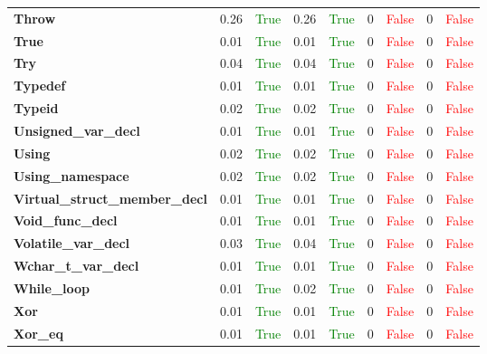 \documentclass{article}
\begin{document}
\begin{xltabular}{\textwidth}{lcccccccc}
\textbf{{\fontsize{10}{12}\selectfont Throw}}& 0.26&\textcolor{green}{True}& 0.26&\textcolor{green}{True}& 0&\textcolor{red}{False}& 0&\textcolor{red}{False} \\[0.5ex]
\textbf{{\fontsize{10}{12}\selectfont True}}& 0.01&\textcolor{green}{True}& 0.01&\textcolor{green}{True}& 0&\textcolor{red}{False}& 0&\textcolor{red}{False} \\[0.5ex]
\textbf{{\fontsize{10}{12}\selectfont Try}}& 0.04&\textcolor{green}{True}& 0.04&\textcolor{green}{True}& 0&\textcolor{red}{False}& 0&\textcolor{red}{False} \\[0.5ex]
\textbf{{\fontsize{10}{12}\selectfont Typedef}}& 0.01&\textcolor{green}{True}& 0.01&\textcolor{green}{True}& 0&\textcolor{red}{False}& 0&\textcolor{red}{False} \\[0.5ex]
\textbf{{\fontsize{10}{12}\selectfont Typeid}}& 0.02&\textcolor{green}{True}& 0.02&\textcolor{green}{True}& 0&\textcolor{red}{False}& 0&\textcolor{red}{False} \\[0.5ex]
\textbf{{\fontsize{10}{12}\selectfont Unsigned\_var\_decl}}& 0.01&\textcolor{green}{True}& 0.01&\textcolor{green}{True}& 0&\textcolor{red}{False}& 0&\textcolor{red}{False} \\[0.5ex]
\textbf{{\fontsize{10}{12}\selectfont Using}}& 0.02&\textcolor{green}{True}& 0.02&\textcolor{green}{True}& 0&\textcolor{red}{False}& 0&\textcolor{red}{False} \\[0.5ex]
\textbf{{\fontsize{10}{12}\selectfont Using\_namespace}}& 0.02&\textcolor{green}{True}& 0.02&\textcolor{green}{True}& 0&\textcolor{red}{False}& 0&\textcolor{red}{False} \\[0.5ex]
\textbf{{\fontsize{10}{12}\selectfont Virtual\_struct\_member\_decl}}& 0.01&\textcolor{green}{True}& 0.01&\textcolor{green}{True}& 0&\textcolor{red}{False}& 0&\textcolor{red}{False} \\[0.5ex]
\textbf{{\fontsize{10}{12}\selectfont Void\_func\_decl}}& 0.01&\textcolor{green}{True}& 0.01&\textcolor{green}{True}& 0&\textcolor{red}{False}& 0&\textcolor{red}{False} \\[0.5ex]
\textbf{{\fontsize{10}{12}\selectfont Volatile\_var\_decl}}& 0.03&\textcolor{green}{True}& 0.04&\textcolor{green}{True}& 0&\textcolor{red}{False}& 0&\textcolor{red}{False} \\[0.5ex]
\textbf{{\fontsize{10}{12}\selectfont Wchar\_t\_var\_decl}}& 0.01&\textcolor{green}{True}& 0.01&\textcolor{green}{True}& 0&\textcolor{red}{False}& 0&\textcolor{red}{False} \\[0.5ex]
\textbf{{\fontsize{10}{12}\selectfont While\_loop}}& 0.01&\textcolor{green}{True}& 0.02&\textcolor{green}{True}& 0&\textcolor{red}{False}& 0&\textcolor{red}{False} \\[0.5ex]
\textbf{{\fontsize{10}{12}\selectfont Xor}}& 0.01&\textcolor{green}{True}& 0.01&\textcolor{green}{True}& 0&\textcolor{red}{False}& 0&\textcolor{red}{False} \\[0.5ex]
\textbf{{\fontsize{10}{12}\selectfont Xor\_eq}}& 0.01&\textcolor{green}{True}& 0.01&\textcolor{green}{True}& 0&\textcolor{red}{False}& 0&\textcolor{red}{False} \\[0.5ex]
\bottomrule
\end{xltabular}
\end{document}

